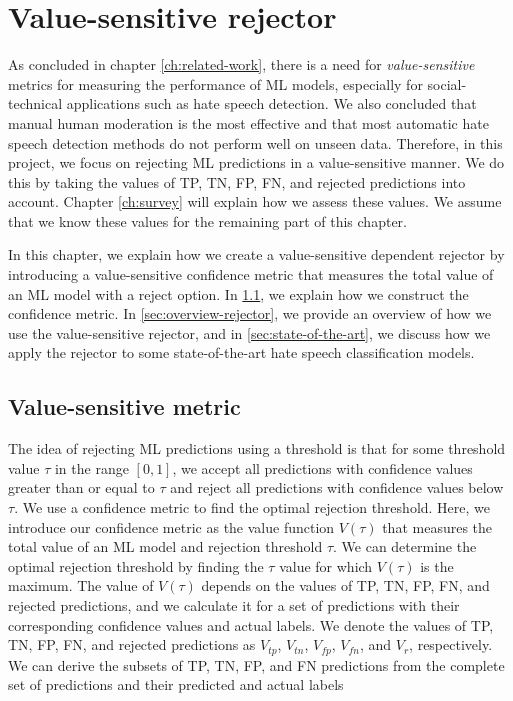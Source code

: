\chapter{Value-sensitive rejector}
\label{ch:rejector}
As concluded in chapter \ref{ch:related-work}, there is a need for \textit{value-sensitive} metrics for measuring the performance of ML models, especially for social-technical applications such as hate speech detection.
%
We also concluded that manual human moderation is the most effective and that most automatic hate speech detection methods do not perform well on unseen data.
%
Therefore, in this project, we focus on rejecting ML predictions in a value-sensitive manner.
%
We do this by taking the values of TP, TN, FP, FN, and rejected predictions into account.
%
%
Chapter \ref{ch:survey} will explain how we assess these values.
%
We assume that we know these values for the remaining part of this chapter.
%

%
In this chapter, we explain how we create a value-sensitive dependent rejector by introducing a value-sensitive confidence metric that measures the total value of an ML model with a reject option.
%
In \ref{sec:value-metric}, we explain how we construct the confidence metric.
%
In \ref{sec:overview-rejector}, we provide an overview of how we use the value-sensitive rejector, and in \ref{sec:state-of-the-art}, we discuss how we apply the rejector to some state-of-the-art hate speech classification models.

\section{Value-sensitive metric}
\label{sec:value-metric}
The idea of rejecting ML predictions using a threshold is that for some threshold value $\tau$ in the range $[0, 1]$, we accept all predictions with confidence values greater than or equal to $\tau$ and reject all predictions with confidence values below $\tau$.
%
We use a confidence metric to find the optimal rejection threshold.
%
Here, we introduce our confidence metric as the value function $V(\tau)$ that measures the total value of an ML model and rejection threshold $\tau$.
%
We can determine the optimal rejection threshold by finding the $\tau$ value for which $V(\tau)$ is the maximum.
%
The value of $V(\tau)$ depends on the values of TP, TN, FP, FN, and rejected predictions, and we calculate it for a set of predictions with their corresponding confidence values and actual labels.
%
We denote the values of TP, TN, FP, FN, and rejected predictions as $V_{tp}$, $V_{tn}$, $V_{fp}$, $V_{fn}$, and $V_r$, respectively.
%
We can derive the subsets of TP, TN, FP, and FN predictions from the complete set of predictions and their predicted and actual labels
%

